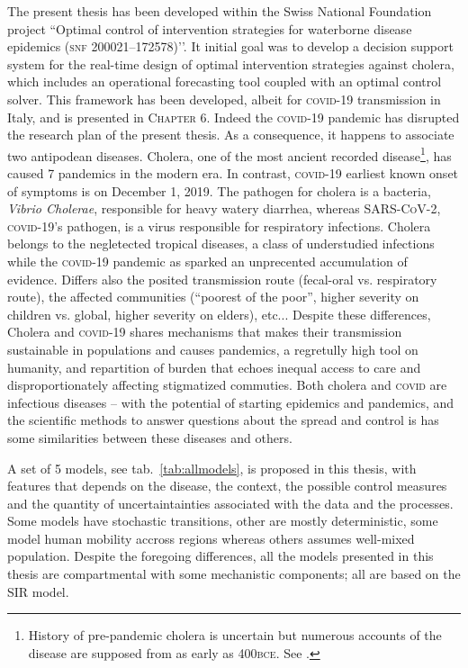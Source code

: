 The present thesis has been developed within the Swiss National Foundation project ``Optimal control of intervention strategies for waterborne disease epidemics (\textsc{snf} 200021–172578)’’. It initial goal was to develop a decision support system for the real-time design of optimal intervention strategies against cholera, which includes an operational forecasting tool coupled with an optimal control solver. This framework has been developed, albeit for \textsc{covid}-19 transmission in Italy, and is presented in \textsc{Chapter 6}. Indeed the \textsc{covid}-19 pandemic has disrupted the research plan of the present thesis. As a consequence, it happens to associate two antipodean diseases. Cholera, one of the most ancient recorded disease\footnote[][10\baselineskip]{History of pre-pandemic cholera is uncertain but numerous accounts of the disease are supposed from as early as 400\textsc{bce}. See .}, has caused 7 pandemics in the modern era. In contrast, \textsc{covid}-19 earliest known onset of symptoms is on December 1, 2019. The pathogen for cholera is a bacteria, \textit{Vibrio Cholerae}, responsible for heavy watery diarrhea, whereas \textsc{SARS-CoV-2}, \textsc{covid}-19’s pathogen, is a virus responsible for respiratory infections. Cholera belongs to the negletected tropical diseases, a class of understudied infections while the \textsc{covid}-19 pandemic as sparked an unprecented accumulation of evidence. Differs also the posited transmission route (fecal-oral vs. respiratory route), the affected communities (``poorest of the poor”, higher severity on children vs. global, higher severity on elders), etc... Despite these differences, Cholera and \textsc{covid}-19 shares mechanisms that makes their transmission sustainable in populations and causes pandemics, a regretully high tool on humanity, and repartition of burden that echoes inequal access to care and disproportionately affecting stigmatized commuties. Both cholera and \textsc{covid} are infectious diseases -- with the potential of starting epidemics and pandemics, and the scientific methods to answer questions about the spread and control is has some similarities between these diseases and others.


A set of 5 models, see tab.~\ref{tab:allmodels}, is proposed in this thesis, with features that depends on the disease, the context, the possible control measures and the quantity of uncertaintainties associated with the data and the processes. Some models have stochastic transitions, other are mostly deterministic, some model human mobility accross regions whereas others assumes well-mixed population. Despite the foregoing differences, all the models presented in this thesis are compartmental with some mechanistic components; all are based on the SIR model.

